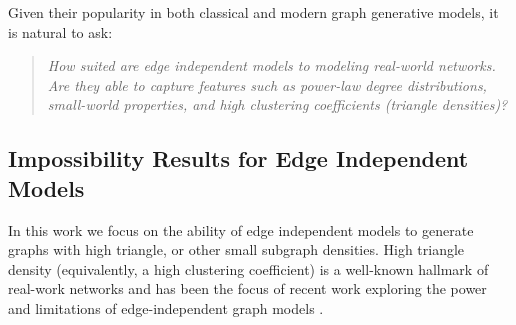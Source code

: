 \documentclass{article}
\begin{document}

Given their popularity in both classical and modern graph generative models, it is natural to ask:
\begin{quote} \emph{How suited are edge independent models to modeling real-world networks. Are they able to capture features such as power-law degree distributions, small-world properties, and high clustering coefficients (triangle densities)? }
\end{quote}

\subsection{Impossibility Results for Edge Independent Models}

In this work we focus on the ability of edge independent models to generate graphs with high triangle, or other small subgraph densities. High triangle density (equivalently, a high clustering coefficient) is a well-known hallmark of real-work networks \cite{WattsStrogatz:1998,SalaCaoWilson:2010,DurakPinarKolda:2012} and has been the focus of recent work exploring the power and limitations of edge-independent graph models \cite{SeshadhriSharmaStolman:2020,ChanpuriyaMuscoSotiropoulos:2020}.
\end{document}
